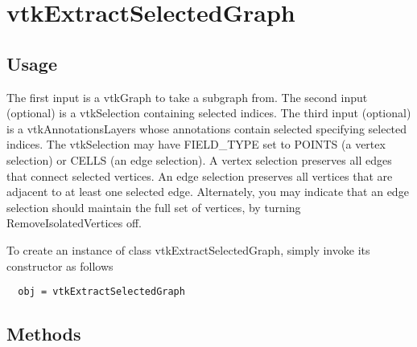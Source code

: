 \section{vtkExtractSelectedGraph}

\subsection{Usage}

 The first input is a vtkGraph to take a subgraph from.
 The second input (optional) is a vtkSelection containing selected 
 indices. The third input (optional) is a vtkAnnotationsLayers whose 
 annotations contain selected specifying selected indices.
 The vtkSelection may have FIELD\_TYPE set to POINTS (a vertex selection)
 or CELLS (an edge selection).  A vertex selection preserves all edges
 that connect selected vertices.  An edge selection preserves all vertices
 that are adjacent to at least one selected edge.  Alternately, you may
 indicate that an edge selection should maintain the full set of vertices,
 by turning RemoveIsolatedVertices off.

To create an instance of class vtkExtractSelectedGraph, simply
invoke its constructor as follows
\begin{verbatim}
  obj = vtkExtractSelectedGraph
\end{verbatim}
\subsection{Methods}

